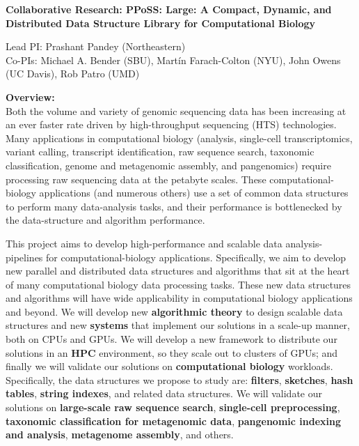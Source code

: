 
\begin{center}

\bf
\Large
Collaborative Research: PPoSS\@: Large: A Compact, Dynamic, and Distributed Data
Structure Library for Computational Biology

\small
Lead PI: Prashant Pandey (Northeastern)\\
Co-PIs: Michael A. Bender (SBU), Mart\'{i}n Farach-Colton (NYU), John Owens (UC Davis), Rob Patro (UMD)
\end{center}

\vspace{-0.3cm}

\noindent \textbf{\large Overview:}\\
Both the volume and variety of genomic sequencing data has been increasing at an ever faster rate driven by high-throughput sequencing (HTS) technologies. 
Many applications in computational biology (\kmer analysis, single-cell transcriptomics, variant calling, transcript identification, raw sequence search, taxonomic classification, genome and metagenomic assembly, and pangenomics) require processing raw sequencing data at the petabyte scales.
%
These computational-biology applications (and numerous others) use a set of common data structures to perform many data-analysis tasks, and their performance is bottlenecked by the data-structure and algorithm performance.

This project aims to develop high-performance and scalable data analysis-pipelines for computational-biology applications. Specifically, we aim to develop new parallel and distributed data structures and algorithms that sit at the heart of many computational biology data processing tasks. These new data structures and algorithms will have wide applicability in computational biology applications and beyond.
%
We will develop new \textbf{algorithmic theory} to design scalable data structures and new \textbf{systems} that implement our solutions in a scale-up manner, both on CPUs and GPUs. We will develop a new framework to distribute our solutions in an \textbf{HPC} environment, so they scale out to clusters of GPUs; and finally we will validate our solutions on \textbf{computational biology} workloads.
%
Specifically, the data structures we propose to study are: \textbf{filters}, \textbf{sketches}, \textbf{hash tables}, \textbf{string indexes}, and related data structures.  We will validate our solutions on \textbf{large-scale raw sequence search}, \textbf{single-cell preprocessing}, \textbf{taxonomic classification for metagenomic data}, \textbf{pangenomic indexing and analysis}, \textbf{metagenome assembly}, and others.

